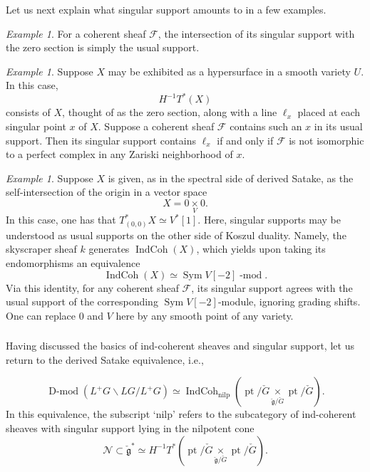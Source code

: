 \documentclass[10pt]{amsart}
\newcommand{\IC}{\on{IndCoh}}
\newcommand{\ICn}{\on{IndCoh}_{\on{nilp}}}
\newcommand{\fg}{\mathfrak{g}}
\newcommand{\on}{\operatorname}
\renewcommand{\mod}{\on{-mod}}
\newcommand{\Dmod}{\on{D-mod}}
\theoremstyle{remark}
\newtheorem{ex}[subsubsection]{Example}
\newcommand{\sN}{\mathscr{N}}
\newcommand{\sF}{\mathscr{F}}
\newcommand{\Sym}{\operatorname{Sym}}
\numberwithin{equation}{section}
\newcommand{\cfg}{\check{\fg}}
\newcommand{\cG}{\check{G}}
\renewcommand{\mod}{\operatorname{-mod}}
\begin{document}
Let us next explain what singular support amounts to in a few examples.

\begin{ex}\label{ex:singsupp1}For a coherent sheaf $\sF$, the intersection of its singular support 
with the zero section is simply the usual support. 
\end{ex}



\begin{ex}\label{ex:singsupp2} Suppose $X$ may be exhibited as a hypersurface in a smooth variety 
$U$. In this case, $$H^{-1} T^*(X)$$consists of $X$, 
thought of as the zero section, along with a line $\ell_x$ placed at 
each singular point $x$ of $X$. Suppose a coherent sheaf $\sF$ contains such 
an $x$ in 
its usual support. Then its singular support contains $\ell_x$ if and only if 
$\sF$ 
is not isomorphic to a perfect complex in any Zariski neighborhood of $x$.
\end{ex}

\begin{ex}Suppose $X$ is given, as in the spectral side of derived Satake, as 
the self-intersection 
of the origin in a vector space$$X = 0 \underset V \times 0.$$
In this case, one has that $T^*_{(0,0)} X \simeq V^*[1]$. Here, 
singular supports may be understood as usual supports on the other side of 
Koszul duality. Namely, the skyscraper 
sheaf $k$ generates $\IC(X)$, which yields upon taking its endomorphisms an 
equivalence 
%
\[
    \IC(X) \simeq \Sym V[-2] \mod. 
\]
%
Via this identity, for any coherent sheaf $\sF$, its singular support agrees 
with the usual support of the corresponding 
$\Sym 
V[-2]$-module, ignoring grading shifts. One can replace $0$ and $V$ here by any smooth point of any variety. \end{ex}

\subsubsection{} Having discussed the basics of ind-coherent sheaves and 
singular support, let us return to the derived Satake equivalence, i.e., 


\begin{equation} \label{e:der} \Dmod(L^+G \backslash LG / L^+G) \simeq  
\ICn( \on{pt} / \cG  \underset{ 
	\cfg / \cG} \times \on{pt} / \cG). \end{equation}
In this equivalence, the subscript `nilp' refers to the subcategory of 
ind-coherent sheaves 
with singular support lying in the nilpotent cone $$\sN \subset \cfg^* \simeq 
H^{-1}T^*( \on{pt}/\cG \underset {\cfg / \cG}   \times \on{pt}/\cG).$$
\end{document}

